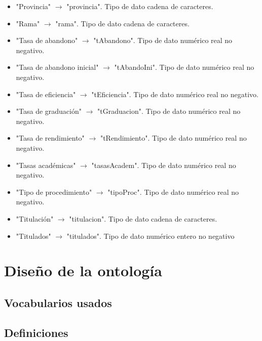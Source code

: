 \begin{itemize}
	\item "Provincia" $\rightarrow$ "provincia". Tipo de dato cadena de caracteres.
	\item "Rama" $\rightarrow$ "rama". Tipo de dato cadena de caracteres.
	\item "Tasa de abandono" $\rightarrow$ "tAbandono". Tipo de dato numérico real no negativo.
	\item "Tasa de abandono inicial" $\rightarrow$ "tAbandoIni". Tipo de dato numérico real no negativo.
	\item "Tasa de eficiencia" $\rightarrow$ "tEficiencia". Tipo de dato numérico real no negativo.
	\item "Tasa de graduación" $\rightarrow$ "tGraduacion". Tipo de dato numérico real no negativo.
	\item "Tasa de rendimiento" $\rightarrow$ "tRendimiento". Tipo de dato numérico real no negativo.
	\item "Tasas académicas" $\rightarrow$ "tasasAcadem". Tipo de dato numérico real no negativo.
	\item "Tipo de procedimiento" $\rightarrow$ "tipoProc". Tipo de dato numérico real no negativo.
	\item "Titulación" $\rightarrow$ "titulacion". Tipo de dato cadena de caracteres.
	\item "Titulados" $\rightarrow$ "titulados". Tipo de dato numérico entero no negativo
\end{itemize}

\section{Diseño de la ontología}

\subsection{Vocabularios usados}

\subsection{Definiciones}